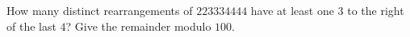 How many distinct rearrangements of $223334444$ have at least one $3$ to the right of the last $4$? Give the remainder modulo $100$.
